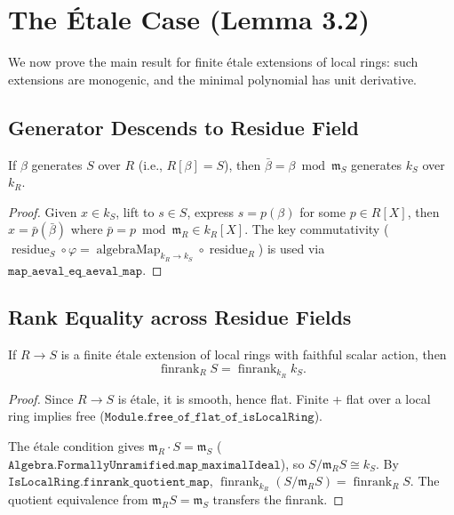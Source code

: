 \chapter{The \'Etale Case (Lemma 3.2)}
\label{ch:etale}

We now prove the main result for finite étale extensions of local rings:
such extensions are monogenic, and the minimal polynomial has unit derivative.

\section{Generator Descends to Residue Field}

\begin{lemma}
  \label{lem:adjoin_residue_eq_top}
  \leanok
  If $\beta$ generates $S$ over $R$ (i.e., $R[\beta] = S$),
  then $\bar\beta = \beta \bmod \mathfrak{m}_S$ generates $k_S$ over $k_R$.
\end{lemma}

\begin{proof}
  \leanok
  Given $x \in k_S$, lift to $s \in S$, express $s = p(\beta)$ for some $p \in R[X]$,
  then $x = \bar{p}(\bar\beta)$ where $\bar{p} = p \bmod \mathfrak{m}_R \in k_R[X]$.
  The key commutativity ($\operatorname{residue}_S \circ \varphi
  = \operatorname{algebraMap}_{k_R \to k_S} \circ \operatorname{residue}_R$)
  is used via $\mathtt{map\_aeval\_eq\_aeval\_map}$.
\end{proof}

\section{Rank Equality across Residue Fields}

\begin{lemma}
  \label{lem:finrank_eq_finrank_residueField}
  \leanok
  If $R \to S$ is a finite étale extension of local rings with faithful
  scalar action, then
  \[
    \operatorname{finrank}_R S = \operatorname{finrank}_{k_R} k_S.
  \]
\end{lemma}

\begin{proof}
  \leanok
  Since $R \to S$ is étale, it is smooth, hence flat.
  Finite + flat over a local ring implies free
  ($\mathtt{Module.free\_of\_flat\_of\_isLocalRing}$).

  The étale condition gives $\mathfrak{m}_R \cdot S = \mathfrak{m}_S$
  ($\mathtt{Algebra.FormallyUnramified.}\allowbreak\mathtt{map\_maximalIdeal}$), so
  $S / \mathfrak{m}_R S \cong k_S$.
  By $\mathtt{IsLocalRing.finrank\_quotient\_map}$,
  $\operatorname{finrank}_{k_R}(S/\mathfrak{m}_R S) = \operatorname{finrank}_R S$.
  The quotient equivalence from $\mathfrak{m}_R S = \mathfrak{m}_S$
  transfers the finrank.
\end{proof}

